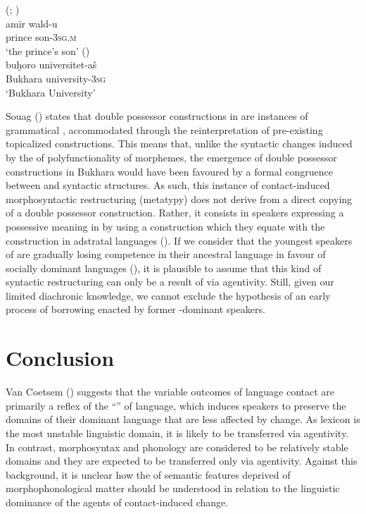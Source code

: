\documentclass[output=paper]{langsci/langscibook}
\begin{document}
\ea\label{28}
{  (\citealt{Ratcliffe2005}; \citealt[56]{Souag2017clitic})}\\
\gll   amīr wald-u\\
        prince son-\textsc{3sg.m}\\
\glt   `the prince’s son'
\ex \label{29}
{ (\citealt[56]{Souag2017clitic})}\\
\gll   buḫoro universitet-aš\\
       Bukhara university-\textsc{3sg}\\
\glt   `Bukhara University'
\z

Souag (\citeyear[157]{Souag2017clitic}) states that double possessor constructions in   are instances of grammatical , accommodated through the reinterpretation of pre-existing topicalized constructions. This means that, unlike the syntactic changes induced by the  of polyfunctionality of morphemes, the emergence of double possessor constructions in Bukhara  would have been favoured by a formal congruence between  and  syntactic structures. As such, this instance of contact-induced morphosyntactic restructuring (metatypy) does not derive from a direct copying of a double possessor construction. Rather, it consists in speakers expressing a possessive meaning in  by using a construction which they equate with the construction in adstratal languages (\citealt[128]{Ross2007}). If we consider that the youngest speakers of   are gradually losing competence in their ancestral language in favour of socially dominant languages (\citealt[128]{Chikovani2005}), it is plausible to assume that this kind of syntactic restructuring can only be a result of  via  agentivity. Still, given our limited diachronic knowledge, we cannot exclude the hypothesis of an early process of borrowing enacted by former -dominant speakers.   

\section{Conclusion}

Van Coetsem (\citeyear[20]{VanCoetsem1988}) suggests that the variable outcomes of language contact are primarily a reflex of the ``'' of language, which induces speakers to preserve the domains of their dominant language that are less affected by change. As lexicon is the most unstable linguistic domain, it is likely to be transferred via  agentivity. In contrast, morphosyntax and phonology are considered to be relatively stable domains and they are expected to be transferred only via  agentivity. Against this background, it is unclear how the  of semantic features deprived of morphophonological matter should be understood in relation to the linguistic dominance of the agents of contact-induced change. 
\end{document}
